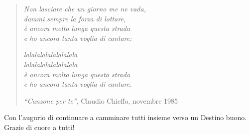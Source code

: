 \begin{verse}
    \textit{Non lasciare che un giorno me ne vada, \\
    dammi sempre la forza di lottare, \\
    è ancora molto lunga questa strada \\
    e ho ancora tanta voglia di cantare:}
    
    \textit{lalalalalalalalalala \\
    lalalalalalalalalala \\
    è ancora molto lunga questa strada \\
    e ho ancora tanta voglia di cantare.}
    
    \textit{``Canzone per te''}, Claudio Chieffo, novembre 1985
\end{verse}

Con l'augurio di continuare a camminare tutti insieme verso un Destino buono. \\
Grazie di cuore a tutti!